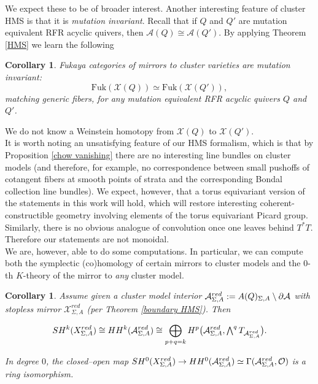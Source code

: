 \documentclass[11pt]{amsart}
\newtheorem{cor}[thm]{Corollary}
\theoremstyle{definition}
\theoremstyle{remark}
\newcommand{\A}{\mathcal{A}}
\newcommand{\X}{\mathcal{X}}
\newcommand{\Fuk}{\mathrm{Fuk}}
\numberwithin{equation}{section}
\begin{document}
We expect these to be of broader interest. Another interesting feature of cluster HMS is that it is \textit{mutation invariant}. Recall that if $Q$ and $Q'$ are mutation equivalent RFR acyclic quivers, then $\mathcal{A}(Q)\cong\mathcal{A}(Q')$. By applying Theorem \ref{HMS} we learn the following 
\begin{cor}\label{mut invar}
    Fukaya categories of mirrors to cluster varieties are mutation invariant: $$\Fuk(\mathcal{X}(Q)) \simeq \Fuk(\mathcal{X}(Q')),$$ matching generic fibers, for any mutation equivalent RFR acyclic quivers $Q$ and $Q'$.
\end{cor}

We do not know a Weinstein homotopy from $\mathcal{X}(Q)$ to $\mathcal{X}(Q')$.\\

It is worth noting an unsatisfying feature of our HMS formalism, which is that by Proposition \ref{chow vanishing} there are no interesting line bundles on cluster models (and therefore, for example, no correspondence between small pushoffs of cotangent fibers at smooth points of strata and the corresponding Bondal collection line bundles). We expect, however, that a torus equivariant version of the statements in this work will hold, which will restore interesting coherent-constructible geometry involving elements of the torus equivariant Picard group.\\

Similarly, there is no obvious analogue of convolution once one leaves behind $T^* T$. Therefore our statements are not monoidal.\\

We are, however, able to do some computations. In particular, we can compute both the symplectic (co)homology of certain mirrors to cluster models and the $0$-th $K$-theory of the mirror to \textit{any} cluster model.

\begin{cor}
    Assume given a cluster model interior $\A^{red}_{\Sigma, A} := \mathcal \A(Q)_{\Sigma,A}\setminus\partial\mathcal A$ with stopless mirror $\X^{red}_{\Sigma, A}$ (per Theorem \ref{boundary HMS}). Then
    
    $$SH^k(\mathcal \X^{red}_{\Sigma, A})\cong HH^k(\A^{red}_{\Sigma, A})\cong\bigoplus_{p+q=k}H^p\bigl(\A^{red}_{\Sigma, A},\textstyle\bigwedge^qT_{\A^{red}_{\Sigma, A}}\bigr).$$

In degree $0$, the closed–open map $SH^0(\mathcal \X^{red}_{\Sigma, A}) \rightarrow HH^0(\A^{red}_{\Sigma, A})\simeq \Gamma(\A^{red}_{\Sigma, A},\mathcal O)$ is a ring isomorphism.
\end{cor}
\end{document}
